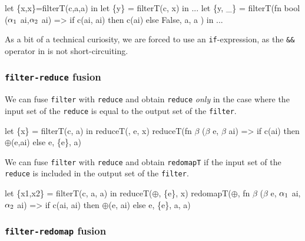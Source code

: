 \begin{colorcode}
let \{x,x\}=filterT(c,a,a) in
let \{y\} = filterT(c, x) in
...
    \emphh{\mymath{\Downarrow}}
let \{y, _\} = filterT(fn bool (\(\alpha_{1}\) ai,\(\alpha_{2}\) ai) =>
                       if   c(ai, ai)
                       then c(ai)
                       else False,
                     a, a ) in
...
\end{colorcode}

As a bit of a technical curiosity, we are forced to use an
\texttt{if}-expression, as the \texttt{\&\&} operator in \LO{} is not
short-circuiting.

\subsubsection{\texttt{filter-reduce} fusion}

We can fuse \texttt{filter} with \texttt{reduce} and obtain
\texttt{reduce} \textit{only} in the case where the input set of the
\texttt{reduce} is equal to the output set of the \texttt{filter}.

\begin{colorcode}
let \{x\} = filterT(c, a) in
reduceT(\mymath{\oplus}, e, x)
    \emphh{\mymath{\Downarrow}}
reduceT(fn \(\beta\) (\(\beta\) e, \(\beta\) ai) =>
          if c(ai) then \(\oplus\)(e,ai) else e,
        \{e\}, a)
\end{colorcode}

We can fuse \texttt{filter} with \texttt{reduce} and obtain
\texttt{redomapT} if the input set of the \texttt{reduce} is included
in the output set of the \texttt{filter}.

\begin{colorcode}
let \{x1,x2\} = filterT(c, a, a)
in  reduceT(\(\oplus\), \{e\}, x)
    \emphh{\mymath{\Downarrow}}
redomapT(\(\oplus\),
         fn \(\beta\) (\(\beta\) e, \(\alpha_{1}\) ai, \(\alpha_{2}\) ai) =>
           if c(ai, ai)
           then \(\oplus\)(e, ai)
           else e,
         \{e\}, a, a)
\end{colorcode}

\subsubsection{\texttt{filter-redomap} fusion}

